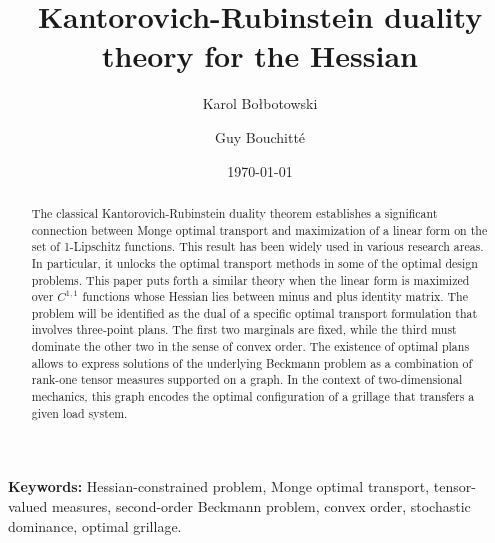 \documentclass[11pt,letterpaper,reqno]{amsart}
\theoremstyle{definition}
\numberwithin{equation}{section}
\begin{document}
	
	
	\title{Kantorovich-Rubinstein duality theory for the Hessian} 
	
	
	
	
	
	
	\author{Karol Bo{\l}botowski \and Guy Bouchitt\'{e}}


	

	
	
	
	\date{\today}
	
	\begin{abstract}  
		
    The classical Kantorovich-Rubinstein duality theorem establishes a significant connection between Monge optimal transport and maximization of a linear form on the set of 1-Lipschitz functions. This result has been widely used in various research areas. In particular, it unlocks the optimal transport methods in some of the optimal design problems. This paper puts forth a similar theory when the linear form is maximized over $C^{1,1}$ functions whose Hessian lies between minus and plus identity matrix. The problem will be identified as the dual of a specific optimal transport formulation that involves three-point plans. The first two marginals are fixed, while the third must dominate the other two in the sense of convex order. The existence of optimal plans allows to express solutions of the underlying Beckmann problem as a combination of rank-one tensor measures supported on a graph. In the context of two-dimensional mechanics, this graph encodes the optimal configuration of a grillage that transfers a given load system.
\end{abstract}

\maketitle

\noindent \textbf{Keywords:}  {Hessian-constrained problem, Monge optimal transport,  tensor-valued measures,
 second-order Beckmann problem, convex order, stochastic dominance, optimal grillage.}
\end{document}
